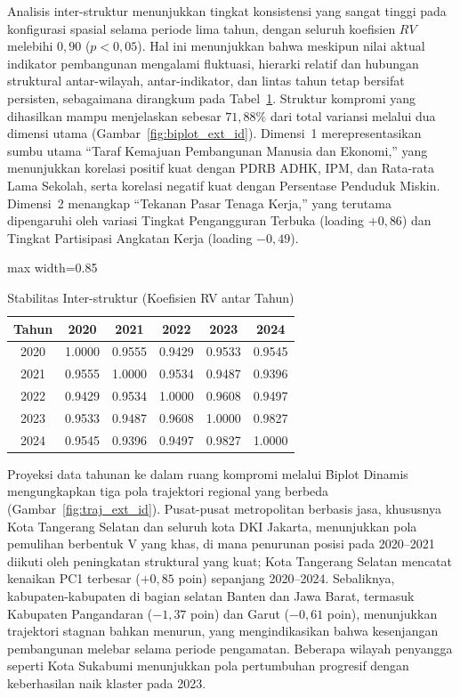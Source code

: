 \begin{singlespace}
Analisis inter-struktur menunjukkan tingkat konsistensi yang sangat tinggi pada konfigurasi spasial selama periode lima tahun, dengan seluruh koefisien $RV$ melebihi $0{,}90$ ($p < 0{,}05$). Hal ini menunjukkan bahwa meskipun nilai aktual indikator pembangunan mengalami fluktuasi, hierarki relatif dan hubungan struktural antar-wilayah, antar-indikator, dan lintas tahun tetap bersifat persisten, sebagaimana dirangkum pada Tabel~\ref{tab:rv_summary_id_ext}. Struktur kompromi yang dihasilkan mampu menjelaskan sebesar $71{,}88\%$ dari total variansi melalui dua dimensi utama (Gambar~\ref{fig:biplot_ext_id}). Dimensi~1 merepresentasikan sumbu utama ``Taraf Kemajuan Pembangunan Manusia dan Ekonomi,'' yang menunjukkan korelasi positif kuat dengan PDRB ADHK, IPM, dan Rata-rata Lama Sekolah, serta korelasi negatif kuat dengan Persentase Penduduk Miskin. Dimensi~2 menangkap ``Tekanan Pasar Tenaga Kerja,'' yang terutama dipengaruhi oleh variasi Tingkat Pengangguran Terbuka (loading $+0{,}86$) dan Tingkat Partisipasi Angkatan Kerja (loading $-0{,}49$).

\begin{table}[H]
    \centering
    \captionsetup{hypcap=false}
    \caption{Stabilitas Inter-struktur (Koefisien RV antar Tahun)}
    \label{tab:rv_summary_id_ext}
    \begin{adjustbox}{max width=0.85\textwidth}
    \begin{tabular}{|c|c|c|c|c|c|}
    \hline
    \textbf{Tahun} & \textbf{2020} & \textbf{2021} & \textbf{2022} & \textbf{2023} & \textbf{2024} \\
    \hline
    2020 & 1.0000 & 0.9555 & 0.9429 & 0.9533 & 0.9545 \\
    2021 & 0.9555 & 1.0000 & 0.9534 & 0.9487 & 0.9396 \\
    2022 & 0.9429 & 0.9534 & 1.0000 & 0.9608 & 0.9497 \\
    2023 & 0.9533 & 0.9487 & 0.9608 & 1.0000 & 0.9827 \\
    2024 & 0.9545 & 0.9396 & 0.9497 & 0.9827 & 1.0000 \\
    \hline
    \end{tabular}
    \end{adjustbox}
\end{table}

Proyeksi data tahunan ke dalam ruang kompromi melalui \f{Biplot Dinamis} mengungkapkan tiga pola trajektori regional yang berbeda (Gambar~\ref{fig:traj_ext_id}). Pusat-pusat metropolitan berbasis jasa, khususnya Kota Tangerang Selatan dan seluruh kota DKI Jakarta, menunjukkan pola pemulihan berbentuk V yang khas, di mana penurunan posisi pada 2020--2021 diikuti oleh peningkatan struktural yang kuat; Kota Tangerang Selatan mencatat kenaikan PC1 terbesar ($+0{,}85$ poin) sepanjang 2020--2024. Sebaliknya, kabupaten-kabupaten di bagian selatan Banten dan Jawa Barat, termasuk Kabupaten Pangandaran ($-1{,}37$ poin) dan Garut ($-0{,}61$ poin), menunjukkan trajektori stagnan bahkan menurun, yang mengindikasikan bahwa kesenjangan pembangunan melebar selama periode pengamatan. Beberapa wilayah penyangga seperti Kota Sukabumi menunjukkan pola pertumbuhan progresif dengan keberhasilan naik klaster pada 2023.


\end{singlespace}
